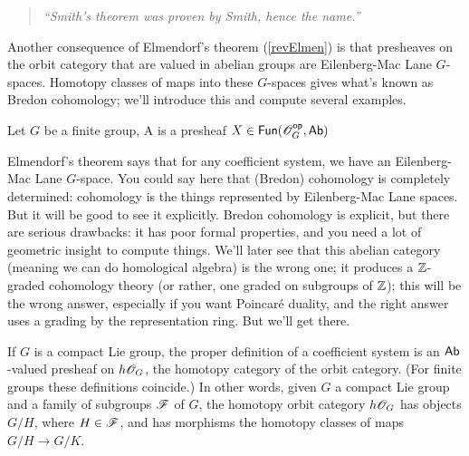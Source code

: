 
\begin{quote}\textit{
	``Smith's theorem was proven by Smith, hence the name.''
}\end{quote}
%
Another consequence of Elmendorf's theorem (\cref{revElmen}) is that presheaves on the orbit category that are
valued in abelian groups are Eilenberg-Mac Lane $G$-spaces. Homotopy classes of maps into these $G$-spaces gives
what's known as Bredon cohomology; we'll introduce this and compute several examples.
\begin{defn}
Let $G$ be a finite group, A  is a presheaf $X\in\mathsf{Fun}(\mathscr O_G^{\mathsf{op}}, \mathsf{Ab})$
\end{defn}
Elmendorf's theorem says that for any coefficient system, we have an Eilenberg-Mac Lane $G$-space. You could say
here that (Bredon) cohomology is completely determined: cohomology is the things represented by Eilenberg-Mac Lane
spaces. But it will be good to see it explicitly. Bredon cohomology is explicit, but there are serious drawbacks:
it has poor formal properties, and you need a lot of geometric insight to compute things. We'll later see that this
abelian category (meaning we can do homological algebra) is the wrong one; it produces a $\mathbb Z$-graded cohomology
theory (or rather, one graded on subgroups of $\mathbb Z$); this will be the wrong answer, especially if you want Poincaré
duality, and the right answer uses a grading by the representation ring. But we'll get there.
\begin{rem}
If $G$ is a compact Lie group, the proper definition of a coefficient system is an $\mathsf{Ab}$-valued presheaf on
$h\mathscr O_G$, the homotopy category of the orbit category. (For finite groups these definitions coincide.) In other
words, given $G$ a compact Lie group and a family of subgroups $\mathscr F$ of $G$, the homotopy orbit category $h\mathscr O_G$
has objects $G/H$, where $H \in \mathscr F$, and has morphisms the homotopy classes of maps $G/H \to G/K$.
\end{rem}

